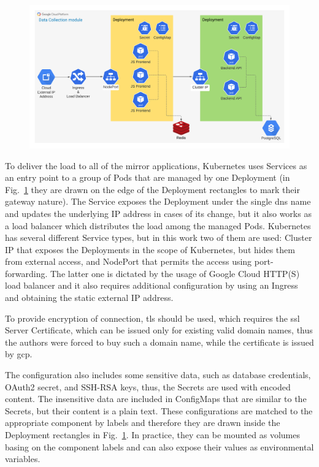 \begin{figure}
    \includegraphics[width=\linewidth]{resources/gcp_diagram}
    \label{fig:gcp_diagram}
\end{figure}

To deliver the load to all of the mirror applications, Kubernetes uses Services as an entry point to a group of Pods that are managed by one Deployment (in Fig.~\ref{fig:gcp_diagram} they are drawn on the edge of the Deployment rectangles to mark their gateway nature).
The Service exposes the Deployment under the single \gls{dns} name and updates the underlying IP address in cases of its change, but it also works as a load balancer which distributes the load among the managed Pods.
Kubernetes has several different Service types, but in this work two of them are used: Cluster IP that exposes the Deployments in the scope of Kubernetes, but hides them from external access, and NodePort that permits the access using port-forwarding.
The latter one is dictated by the usage of Google Cloud HTTP(S) load balancer and it also requires additional configuration by using an Ingress and obtaining the static external IP address.

To provide encryption of connection, \gls{tls} should be used, which requires the \gls{ssl} Server Certificate, which can be issued only for existing valid domain names, thus the authors were forced to buy such a domain name, while the certificate is issued by \gls{gcp}.

The configuration also includes some sensitive data, such as database credentials, OAuth2 secret, and SSH-RSA keys, thus, the Secrets are used with encoded content.
The insensitive data are included in ConfigMaps that are similar to the Secrets, but their content is a plain text.
These configurations are matched to the appropriate component by labels and therefore they are drawn inside the Deployment rectangles in Fig.~\ref{fig:gcp_diagram}.
In practice, they can be mounted as volumes basing on the component labels and can also expose their values as environmental variables.

